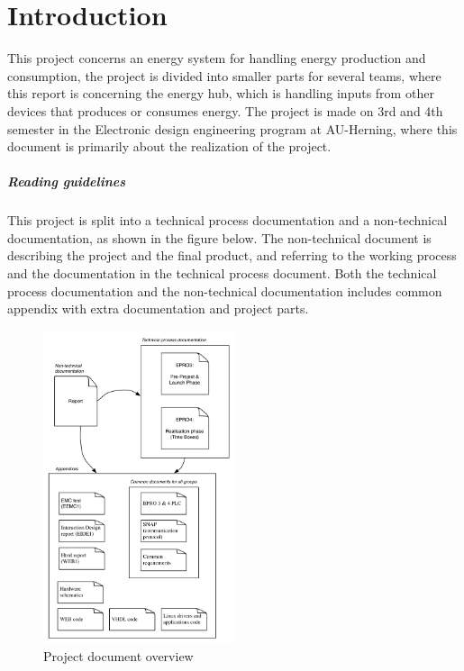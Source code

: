 \chapter{Introduction}
This project concerns an energy system for handling energy production and consumption, the project is divided into smaller parts for several teams, where this report is concerning the energy hub, which is handling inputs from other devices that produces or consumes energy. The project is made on 3rd and 4th semester in the Electronic design engineering program at AU-Herning, where this document is primarily about the realization of the project.
\paragraph{Reading guidelines}
This project is split into a technical process documentation and a non-technical documentation, as shown in the figure below. The non-technical document is describing the project and the final product, and referring to the working process and the documentation in the technical process document. Both the technical process documentation and the non-technical documentation includes common appendix with extra documentation and project parts.
\begin{figure}[H]
	\begin{centering}
		 \includegraphics[width=0.5\textwidth]{images/report_ref.pdf}
		\caption*{Project document overview}
	\end{centering}
\end{figure}

